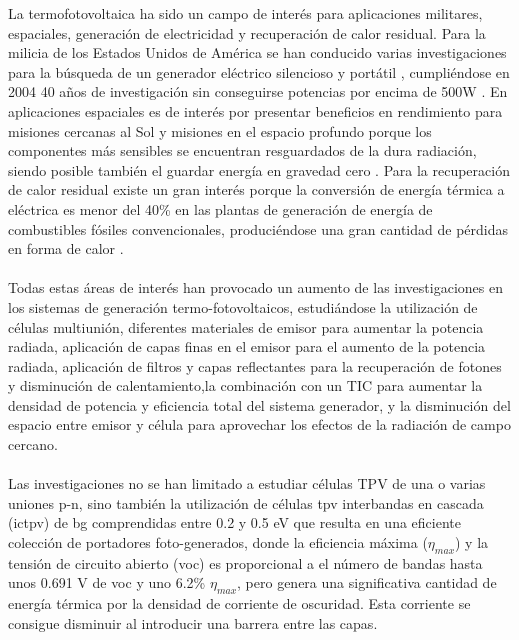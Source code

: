 La termofotovoltaica ha sido un campo de interés para aplicaciones militares, espaciales, generación de electricidad y recuperación de calor residual. Para la milicia de los Estados Unidos de América se han conducido varias investigaciones para la búsqueda de un generador eléctrico silencioso y portátil \cite{military_TPV}, cumpliéndose en 2004 40 años de investigación sin conseguirse potencias por encima de 500W \cite{military_TPV_40Years}. En aplicaciones espaciales es de interés por presentar beneficios en rendimiento para misiones cercanas al Sol y misiones en el espacio profundo porque los componentes más sensibles se encuentran resguardados de la dura radiación, siendo posible también el guardar energía en gravedad cero \cite{TPV_space_applications}. Para la recuperación de calor residual existe un gran interés porque la conversión de energía térmica a eléctrica es menor del 40\% en las plantas de generación de energía de combustibles fósiles convencionales, produciéndose una gran cantidad de pérdidas en forma de calor \cite{wasteHeat_TPV}.\\\\
Todas estas áreas de interés han provocado un aumento de las investigaciones en los sistemas de generación termo-fotovoltaicos, estudiándose la utilización de células multiunión, diferentes materiales de emisor para aumentar la potencia radiada, aplicación de capas finas en el emisor para el aumento de la potencia radiada\cite{doi:Near_field_ThinFilm}, aplicación de filtros \cite{multiLayerFilters} y capas reflectantes para la recuperación de fotones y disminución de calentamiento\cite{thermoionic_TPV_NF},la combinación con un TIC para aumentar la densidad de potencia y eficiencia total del sistema generador\cite{thermoionic_TPV_NF,progress_Thermoionic_TPV}, y la disminución del espacio entre emisor y célula para aprovechar los efectos de la radiación de campo cercano\cite{thermoionic_TPV_NF,modelEfficiency_NF_TPV,nf_TPV_Pillars_SiO2}.\\\\
Las investigaciones no se han limitado a estudiar células TPV de una o varias uniones p-n, sino también la utilización de células \acrshort{tpv} interbandas en cascada (\acrshort{ictpv}) de \acrshort{bg} comprendidas entre 0.2 y 0.5 eV que resulta en una eficiente colección de portadores foto-generados, donde la eficiencia máxima ($\eta_{max}$) y la tensión de circuito abierto (\acrshort{voc}) es proporcional a el número de bandas hasta unos 0.691 V de \acrshort{voc} y uno 6.2\% $\eta_{max}$, pero genera una significativa cantidad de energía térmica por la densidad de corriente de oscuridad\cite{MultiEstados_Capas_TPVs}. Esta corriente se consigue disminuir al introducir una barrera entre las capas\cite{decreaseDarkCurrent}.\\\\
